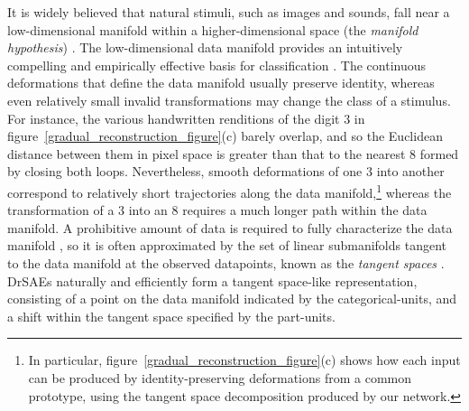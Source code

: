 \documentclass{article} %
\begin{document}
It is widely believed that natural stimuli, such as images and sounds, fall near a low-dimensional manifold within a higher-dimensional space (the \emph{manifold hypothesis}) \citep{lee2003, olshausen2004, bengio2012}.  %
The low-dimensional data manifold provides an intuitively compelling and empirically effective basis for classification \citep{simard1993, simard1998, rifai2011b}.  The continuous deformations that define the data manifold usually preserve identity, whereas even relatively small invalid transformations may change the class of a stimulus.  For instance, the various handwritten renditions of the digit $3$ in figure~\ref{gradual_reconstruction_figure}(c) barely overlap, and so the Euclidean distance between them in pixel space is greater than that to the nearest $8$ formed by closing both loops.  Nevertheless, smooth deformations of one $3$ into another correspond to relatively short trajectories along the data manifold,\footnote{In particular, figure~\ref{gradual_reconstruction_figure}(c) shows how each input can be produced by identity-preserving deformations from a common prototype, using the tangent space decomposition produced by our network.} whereas the transformation of a $3$ into an $8$ requires a much longer path within the data manifold.  
A prohibitive amount of data is required to fully characterize the data manifold \citep{narayanan2010}, so it is often approximated by the set of linear submanifolds tangent to the data manifold at the observed datapoints, known as the \emph{tangent spaces} \citep{simard1998, rifai2011b, ekanadham2011}.  %
DrSAEs naturally and efficiently form a tangent space-like representation, consisting of a point on the data manifold indicated by the categorical-units, and a shift within the tangent space specified by the part-units.  %
\end{document}
